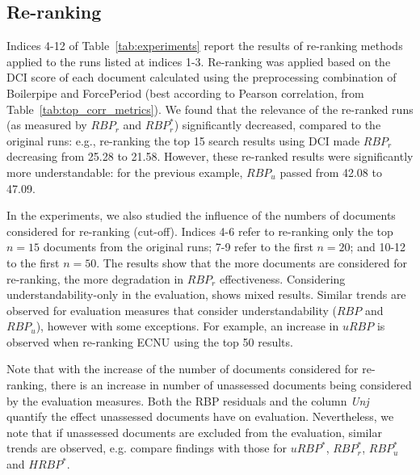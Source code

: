 

\subsection{Re-ranking}
\label{results:reranking}

Indices 4-12 of Table~\ref{tab:experiments} report the results of re-ranking methods applied to the runs listed at indices 1-3. Re-ranking was applied based on the DCI score of each document calculated using the preprocessing combination of Boilerpipe and ForcePeriod (best according to Pearson correlation, from Table~\ref{tab:top_corr_metrics}).
We found that the relevance of the re-ranked runs (as measured by $RBP_r$ and $RBP_r^*$) significantly decreased, compared to the original runs: e.g.,  re-ranking the top 15 search results using DCI  made $RBP_r$ decreasing from 25.28 to 21.58. However, these re-ranked results were significantly more understandable: for the previous example, $RBP_u$ passed from 42.08 to 47.09.

In the experiments, we also studied the influence of the numbers of documents considered for re-ranking (cut-off). Indices 4-6 refer to re-ranking only the top $n=15$ documents from the original runs; 7-9 refer to the first $n=20$; and 10-12 to the first $n=50$. The results show that the more documents are considered for re-ranking, the more degradation in $RBP_r$ effectiveness. Considering understandability-only in the evaluation, shows mixed results. Similar trends are observed for evaluation measures that consider understandability ($RBP$ and $RBP_u$), however with some exceptions. For example, an increase in $uRBP$ is observed when re-ranking ECNU using the top 50 results. 

Note that with the increase of the number of documents considered for re-ranking, there is an increase in number of unassessed documents being considered by the evaluation measures. Both the RBP residuals and the column \textit{Unj} quantify the effect unassessed documents have on evaluation. Nevertheless, we note that if unassessed documents are excluded from the evaluation, similar trends are observed, e.g. compare findings with those for $uRBP^*$, $RBP_r^*$, $RBP_u^*$ and $HRBP^*$.


